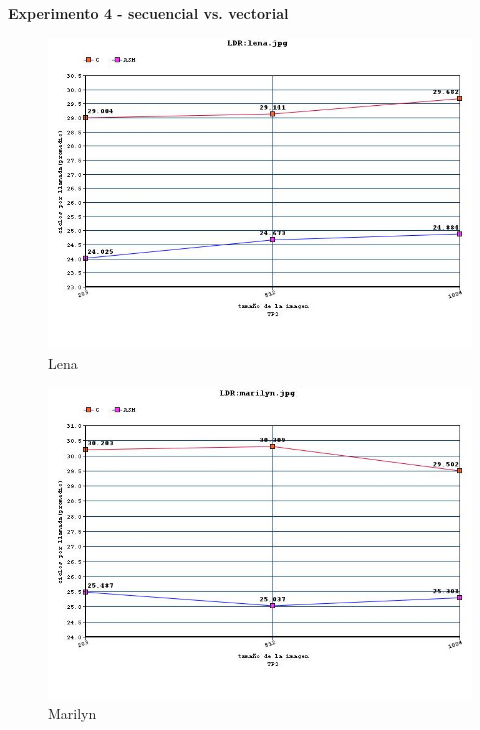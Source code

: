 \vspace*{0.3cm} \noindent
\textbf{Experimento 4 - secuencial vs. vectorial}

\begin{figure}
  \begin{center}
	\includegraphics[scale=0.66]{imagenes/ldr-lena.jpg}
	\caption{Lena}
	\label{Lena}
  \end{center}
\end{figure}

\begin{figure}
  \begin{center}
	\includegraphics[scale=0.66]{imagenes/ldr-marilyn.jpg}
	\caption{Marilyn}
	\label{Marilyn}
  \end{center}
\end{figure}

